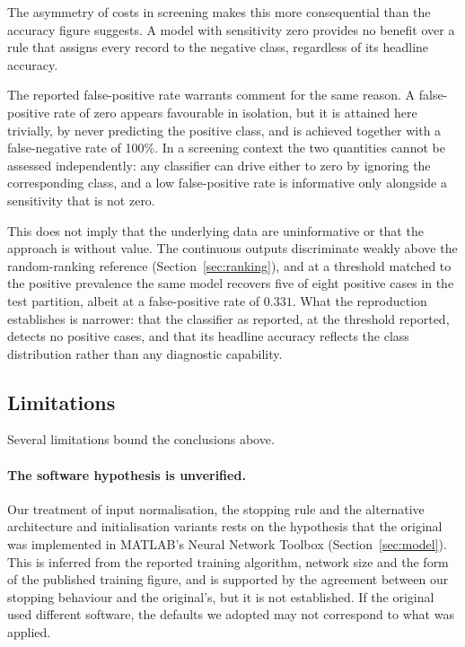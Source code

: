 The asymmetry of costs in screening makes this more consequential than the
accuracy figure suggests. A model with sensitivity zero provides no benefit
over a rule that assigns every record to the negative class, regardless of its
headline accuracy.

The reported false-positive rate warrants comment for the same reason. A
false-positive rate of zero appears favourable in isolation, but it is attained
here trivially, by never predicting the positive class, and is achieved
together with a false-negative rate of 100\%. In a screening context the two
quantities cannot be assessed independently: any classifier can drive either to
zero by ignoring the corresponding class, and a low false-positive rate is
informative only alongside a sensitivity that is not zero.

This does not imply that the underlying data are uninformative or that the
approach is without value. The continuous outputs discriminate weakly above the
random-ranking reference (Section~\ref{sec:ranking}), and at a threshold
matched to the positive prevalence the same model recovers five of eight
positive cases in the test partition, albeit at a false-positive rate of
$0.331$. What the reproduction establishes is narrower: that the classifier as
reported, at the threshold reported, detects no positive cases, and that its
headline accuracy reflects the class distribution rather than any diagnostic
capability.

\subsection{Limitations}\label{sec:limitations}

Several limitations bound the conclusions above.

\paragraph{The software hypothesis is unverified.} Our treatment of input
normalisation, the stopping rule and the alternative architecture and
initialisation variants rests on the hypothesis that the original was
implemented in MATLAB's Neural Network Toolbox
(Section~\ref{sec:model}). This is inferred from the reported training
algorithm, network size and the form of the published training figure, and is
supported by the agreement between our stopping behaviour and the original's,
but it is not established. If the original used different software, the
defaults we adopted may not correspond to what was applied.

